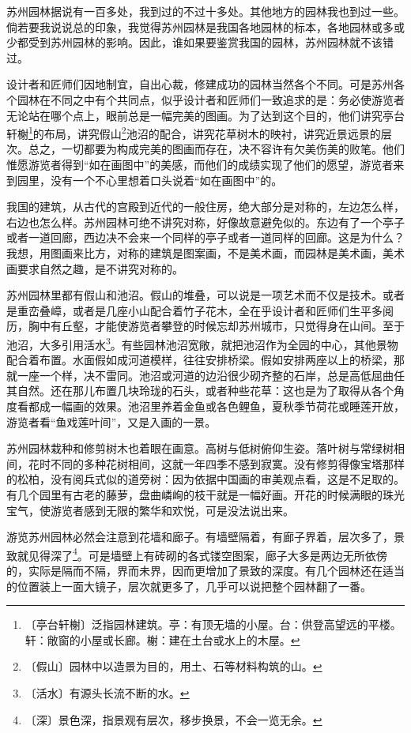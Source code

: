 \documentclass[12pt,UTF-8,openany]{ctexbook}
\begin{document}
\begin{large}
    
    苏州园林据说有一百多处，我到过的不过十多处。其他地方的园林我也到过一些。倘若要我说说总的印象，我觉得苏州园林是我国各地园林的标本，各地园林或多或少都受到苏州园林的影响。因此，谁如果要鉴赏我国的园林，苏州园林就不该错过。
    
    设计者和匠师们因地制宜，自出心裁，修建成功的园林当然各个不同。可是苏州各个园林在不同之中有个共同点，似乎设计者和匠师们一致追求的是：务必使游览者无论站在哪个点上，眼前总是一幅完美的图画。为了达到这个目的，他们讲究亭台轩榭\footnote{〔亭台轩榭〕泛指园林建筑。亭：有顶无墙的小屋。台：供登高望远的平楼。轩：敞窗的小屋或长廊。榭：建在土台或水上的木屋。}的布局，讲究假山\footnote{〔假山〕园林中以造景为目的，用土、石等材料构筑的山。}池沼的配合，讲究花草树木的映衬，讲究近景远景的层次。总之，一切都要为构成完美的图画而存在，决不容许有欠美伤美的败笔。他们惟愿游览者得到“如在画图中”的美感，而他们的成绩实现了他们的愿望，游览者来到园里，没有一个不心里想着口头说着“如在画图中”的。
    
    我国的建筑，从古代的宫殿到近代的一般住房，绝大部分是对称的，左边怎么样，右边也怎么样。苏州园林可绝不讲究对称，好像故意避免似的。东边有了一个亭子或者一道回廊，西边决不会来一个同样的亭子或者一道同样的回廊。这是为什么？我想，用图画来比方，对称的建筑是图案画，不是美术画，而园林是美术画，美术画要求自然之趣，是不讲究对称的。
    
    苏州园林里都有假山和池沼。假山的堆叠，可以说是一项艺术而不仅是技术。或者是重峦叠嶂，或者是几座小山配合着竹子花木，全在乎设计者和匠师们生平多阅历，胸中有丘壑，才能使游览者攀登的时候忘却苏州城市，只觉得身在山间。至于池沼，大多引用活水\footnote{〔活水〕有源头长流不断的水。}。有些园林池沼宽敞，就把池沼作为全园的中心，其他景物配合着布置。水面假如成河道模样，往往安排桥梁。假如安排两座以上的桥梁，那就一座一个样，决不雷同。池沼或河道的边沿很少砌齐整的石岸，总是高低屈曲任其自然。还在那儿布置几块玲珑的石头，或者种些花草：这也是为了取得从各个角度看都成一幅画的效果。池沼里养着金鱼或各色鲤鱼，夏秋季节荷花或睡莲开放，游览者看“鱼戏莲叶间”，又是入画的一景。
    
    苏州园林栽种和修剪树木也着眼在画意。高树与低树俯仰生姿。落叶树与常绿树相间，花时不同的多种花树相间，这就一年四季不感到寂寞。没有修剪得像宝塔那样的松柏，没有阅兵式似的道旁树：因为依据中国画的审美观点看，这是不足取的。有几个园里有古老的藤萝，盘曲嶙峋的枝干就是一幅好画。开花的时候满眼的珠光宝气，使游览者感到无限的繁华和欢悦，可是没法说出来。
    
    游览苏州园林必然会注意到花墙和廊子。有墙壁隔着，有廊子界着，层次多了，景致就见得深了\footnote{〔深〕景色深，指景观有层次，移步换景，不会一览无余。}。可是墙壁上有砖砌的各式镂空图案，廊子大多是两边无所依傍的，实际是隔而不隔，界而未界，因而更增加了景致的深度。有几个园林还在适当的位置装上一面大镜子，层次就更多了，几乎可以说把整个园林翻了一番。
    

\end{large}
\end{document}
